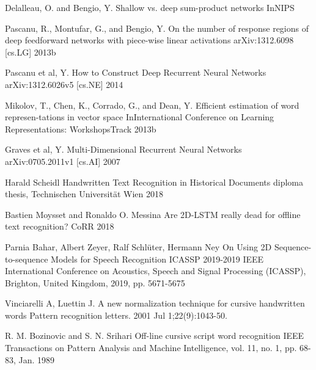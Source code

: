 \documentclass{article}
\begin{document}
\begin{thebibliography}{9}
    Delalleau, O. and Bengio, Y.
    \newblock Shallow vs. deep sum-product networks
    \newblock InNIPS
    
    Pascanu, R., Montufar, G., and Bengio, Y.
    \newblock On the number of response regions of deep feedforward networks with piece-wise linear activations
    \newblock arXiv:1312.6098 [cs.LG] 2013b
    
    Pascanu et al, Y.
    \newblock How to Construct Deep Recurrent Neural Networks
    \newblock arXiv:1312.6026v5 [cs.NE] 2014
    
    Mikolov, T., Chen, K., Corrado, G., and Dean, Y.
    \newblock Efficient estimation of word represen-tations in vector space
    \newblock InInternational Conference on Learning Representations: WorkshopsTrack 2013b
    
    Graves et al, Y.
    \newblock Multi-Dimensional Recurrent Neural Networks
    \newblock arXiv:0705.2011v1  [cs.AI] 2007
    
    Harald Scheidl
    \newblock Handwritten Text Recognition in Historical Documents
    \newblock diploma thesis, Technischen Universität Wien 2018
    
    Bastien Moysset and Ronaldo O. Messina
    \newblock Are 2D-LSTM really dead for offline text recognition?
    \newblock CoRR 2018
    
     Parnia Bahar, Albert Zeyer, Ralf Schlüter, Hermann Ney 
    \newblock On Using 2D Sequence-to-sequence Models for Speech Recognition
    \newblock ICASSP 2019-2019 IEEE International Conference on Acoustics, Speech and Signal Processing (ICASSP), Brighton, United Kingdom, 2019, pp. 5671-5675
    
     Vinciarelli A, Luettin J.
    \newblock A new normalization technique for cursive handwritten words
    \newblock Pattern recognition letters. 2001 Jul 1;22(9):1043-50.

     R. M. Bozinovic and S. N. Srihari
    \newblock Off-line cursive script word recognition
    \newblock IEEE Transactions on Pattern Analysis and Machine Intelligence, vol. 11, no. 1, pp. 68-83, Jan. 1989
        
\end{thebibliography}
\end{document}
